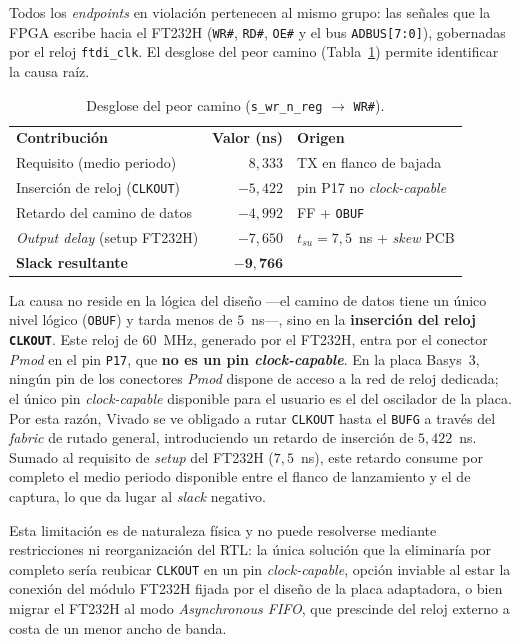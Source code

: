 \documentclass[../main.tex]{subfiles}
\begin{document}
Todos los \textit{endpoints} en violación pertenecen al mismo grupo: las señales que la \ac{FPGA} escribe hacia el FT232H (\texttt{WR\#}, \texttt{RD\#}, \texttt{OE\#} y el bus \texttt{ADBUS[7:0]}), gobernadas por el reloj \texttt{ftdi\_clk}. El desglose del peor camino (Tabla~\ref{tab:worst_path}) permite identificar la causa raíz.

\begin{table}[H]
\centering
\caption{Desglose del peor camino (\texttt{s\_wr\_n\_reg} $\rightarrow$ \texttt{WR\#}).}
\label{tab:worst_path}
\begin{tabular}{lrl}
\rowcolor[HTML]{156082}
{\color{white}\textbf{Contribución}} & {\color{white}\textbf{Valor (ns)}} & {\color{white}\textbf{Origen}} \\
\rowcolor[HTML]{C0E6F5}
Requisito (medio periodo) & $8{,}333$ & TX en flanco de bajada \\
Inserción de reloj (\texttt{CLKOUT}) & $-5{,}422$ & pin P17 no \textit{clock-capable} \\
\rowcolor[HTML]{C0E6F5}
Retardo del camino de datos & $-4{,}992$ & FF + \texttt{OBUF} \\
\textit{Output delay} (setup FT232H) & $-7{,}650$ & $t_{su}=7{,}5$~ns + \textit{skew} PCB \\
\rowcolor[HTML]{C0E6F5}
\textbf{Slack resultante} & $\mathbf{-9{,}766}$ & \\
\end{tabular}
\end{table}

La causa no reside en la lógica del diseño —el camino de datos tiene un único nivel lógico (\texttt{OBUF}) y tarda menos de $5$~ns—, sino en la \textbf{inserción del reloj \texttt{CLKOUT}}. Este reloj de $60$~MHz, generado por el FT232H, entra por el conector \textit{Pmod} en el pin \texttt{P17}, que \textbf{no es un pin \textit{clock-capable}}. En la placa Basys~3, ningún pin de los conectores \textit{Pmod} dispone de acceso a la red de reloj dedicada; el único pin \textit{clock-capable} disponible para el usuario es el del oscilador de la placa. Por esta razón, Vivado se ve obligado a rutar \texttt{CLKOUT} hasta el \texttt{BUFG} a través del \textit{fabric} de rutado general, introduciendo un retardo de inserción de $5{,}422$~ns. Sumado al requisito de \textit{setup} del FT232H ($7{,}5$~ns), este retardo consume por completo el medio periodo disponible entre el flanco de lanzamiento y el de captura, lo que da lugar al \textit{slack} negativo.

Esta limitación es de naturaleza física y no puede resolverse mediante restricciones ni reorganización del \ac{RTL}: la única solución que la eliminaría por completo sería reubicar \texttt{CLKOUT} en un pin \textit{clock-capable}, opción inviable al estar la conexión del módulo FT232H fijada por el diseño de la placa adaptadora, o bien migrar el FT232H al modo \textit{Asynchronous FIFO}, que prescinde del reloj externo a costa de un menor ancho de banda.
\end{document}
